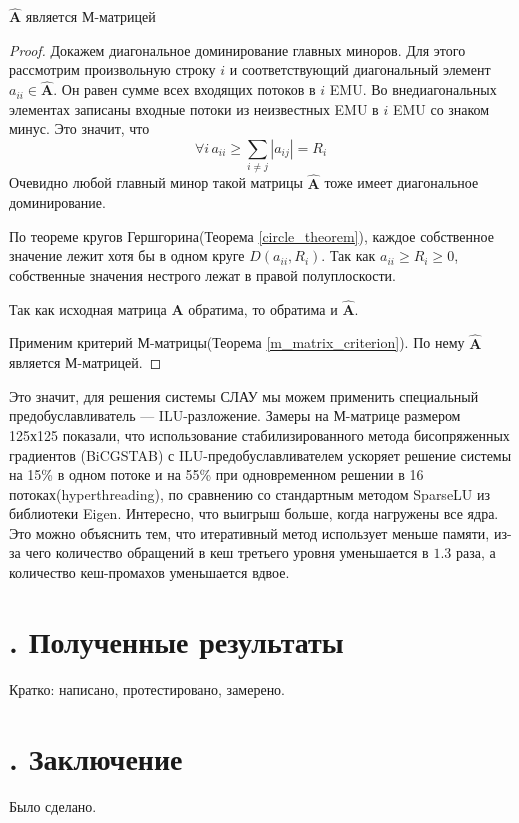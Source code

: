 \documentclass[14pt, a4paper]{extreport}
\begin{document}
\begin{theorem}
	$\hat{\mathbf{A}}$ является М-матрицей
\end{theorem}

\begin{proof}
	Докажем диагональное доминирование главных миноров. Для этого рассмотрим произвольную строку $i$ и соответствующий диагональный элемент $a_{ii} \in \hat{\mathbf{A}}$. Он равен сумме всех входящих потоков в $i$ EMU. Во внедиагональных элементах записаны входные потоки из неизвестных EMU в $i$ EMU со знаком минус. Это значит, что $$\forall i \, a_{ii} \geq \sum_{i \neq j} |a_{ij}| = R_i$$Очевидно любой главный минор такой матрицы $\hat{\mathbf{A}}$ тоже имеет диагональное доминирование. 
	
	По теореме кругов Гершгорина(Теорема \ref{circle_theorem}), каждое собственное значение лежит хотя бы в одном круге $D(a_{ii}, R_i)$. Так как $a_{ii} \geq R_i \geq 0$, собственные значения нестрого лежат в правой полуплоскости.
	
	Так как исходная матрица $\mathbf{A}$ обратима, то обратима и $\hat{\mathbf{A}}$.
	
	Применим критерий М-матрицы(Теорема \ref{m_matrix_criterion}). По нему $\hat{\mathbf{A}}$ является М-матрицей.	
\end{proof}

Это значит, для решения системы СЛАУ мы можем применить специальный предобуславливатель --- ILU-разложение. Замеры на М-матрице размером 125х125 показали, что использование стабилизированного метода бисопряженных градиентов (BiCGSTAB) с ILU-предобуславливателем ускоряет решение системы на 15\% в одном потоке и на 55\% при одновременном решении в 16 потоках(hyperthreading), по сравнению со стандартным методом SparseLU из библиотеки Eigen. Интересно, что выигрыш больше, когда нагружены все ядра. Это можно объяснить тем, что итеративный метод использует меньше памяти, из-за чего количество обращений в кеш третьего уровня уменьшается в $1.3$ раза, а количество кеш-промахов уменьшается вдвое. 

\chapter[Полученные результаты]{\thechapter{}. Полученные результаты}
Кратко: написано, протестировано, замерено.

\chapter[Заключение]{\thechapter{}. Заключение}
Было сделано. 
\end{document}
